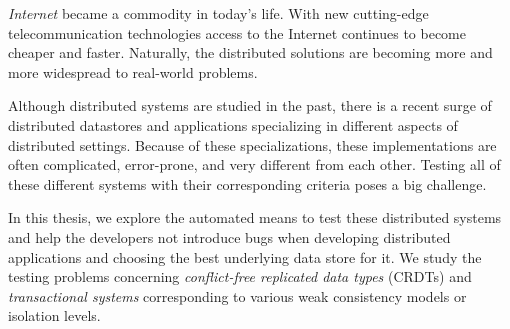 


\emph{Internet} became a commodity in today's life. With new cutting-edge telecommunication technologies access to the Internet continues to become cheaper and faster. Naturally, the distributed solutions are becoming more and more widespread to real-world problems. 

Although distributed systems are studied in the past, there is a recent surge of distributed datastores and applications specializing in different aspects of distributed settings. Because of these specializations, these implementations are often complicated, error-prone, and very different from each other. Testing all of these different systems with their corresponding criteria poses a big challenge.

In this thesis, we explore the automated means to test these distributed systems and help the developers not introduce bugs when developing distributed applications and choosing the best underlying data store for it. We study the testing problems concerning \emph{conflict-free replicated data types} (CRDTs) and \emph{transactional systems} corresponding to various weak consistency models or isolation levels.


